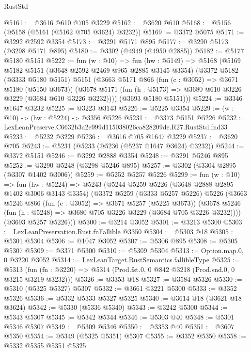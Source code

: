 \begin{lexlean}{RustStd}
\begin{coremodule}
@5161 := @3616 @610 @705 @3229
@5162 := @3620 @610
@5168 := @5156 (@5158 (@5161 (@5162 @705 @3624) @3232))
@5169 := @3372 @5075
@5171 := @3292 @2592 @3354
@5173 := @3291 @5171 @895
@5177 := @3290 @5173 (@3298 @5171 @895)
@5180 := @3302 (@4949 (@4950 @2885))
@5182 := @5177 @5180 @5151
@5222 := fun (w : @10) =>
  fun (hw : @5149) =>
  @5168
    (@5169
      @5182
      @5151
      (@3648 @2592 @2469 @965 @2885 @3145 @3354)
      (@3372
        @5182
        (@3333 @5180 @5151)
        @5151
        (@3663
          @5171
          @866
          (fun (c : @3052) => @3671 @5180 (@5150 @3673))
          (@3678 @5171 (fun (h : @5173) => @3680 @610 @3226 @3229 (@3684 @610 @3226 @3232))))
        (@3693 @5180 @5151)))
@5224 := @3346 @1647 @3232
@5225 := @3223 @3143
@5226 := @5225 @3354
@5229 := (w : @10) -> (hw : @5224) -> @3356 @5226
@5231 := @3373 @5151 @5226
@5232 := LexLeanPreserve.C6632b3a2e999d115038026ca828209de.R27.RustStd.fnd33
@5233 := @5232 @3229
@5236 := @3616 @705 @1647 @3229
@5237 := @3620 @705
@5243 := @5231 (@5233 (@5236 (@5237 @1647 @3624) @3232))
@5244 := @3372 @5151
@5246 := @3292 @2888 @3354
@5248 := @3291 @5246 @895
@5252 := @3290 @5248 (@3298 @5246 @895)
@5257 := @3302 (@3304 @2895 (@3307 @1402 @3006))
@5259 := @5252 @5257 @5226
@5299 := fun (w : @10) =>
  fun (hw : @5224) =>
  @5243
    (@5244
      @5259
      @5226
      (@3648 @2888 @2895 @1402 @3006 @3143 @3354)
      (@3372
        @5259
        (@3333 @5257 @5226)
        @5226
        (@3663
          @5246
          @866
          (fun (c : @3052) => @3671 @5257 (@5225 @3673))
          (@3678 @5246 (fun (h : @5248) => @3680 @705 @3226 @3229 (@3684 @705 @3226 @3232))))
        (@3693 @5257 @5226)))
@5300 := @3214 @3052
@5301 := @3213 @5300
@5303 := LexLeanPreservation.Rust.fnFallible @3350
@5304 := @5303 @18
@5305 := @5301 @5304
@5306 := @1047 @3052
@5307 := @5306 @895
@5308 := @5305 @5307
@5309 := @3371 @5300
@5310 := @5309 @5304
@5313 := Option.map.{0, 0} @3220 @3052
@5314 := LexLeanTarget.RustSemantics.fallibleType
@5325 := @5313
    (fun (fn : @3220) => @5314 (Prod.fst.{0, 0} @842 @3218 (Prod.snd.{0, 0} @3215 @3219 @3232)))
@5326 := @3353 @18
@5327 := @3584 @5326
@5330 := @5310 (@5325 @5327) @5307
@5332 := @3661 @3221 @5300
@5333 := @3352 @5326
@5336 := @5332 @5333 @5327 @5325
@5340 := @3614 @18 (@3621 @18 @3624)
@5342 := @5330 (@5336 @5340)
@5343 := @3242 @5300
@5344 := @5343 @5307
@5345 := @5342 @5344
@5346 := @5303 @40
@5348 := @5301 @5346 @5307
@5349 := @5309 @5346
@5350 := @3353 @40
@5351 := @3607 @5350
@5354 := @5349 (@5325 @5351) @5307
@5355 := @3352 @5350
@5358 := @5332 @5355 @5351 @5325

\end{coremodule}
\end{lexlean}
